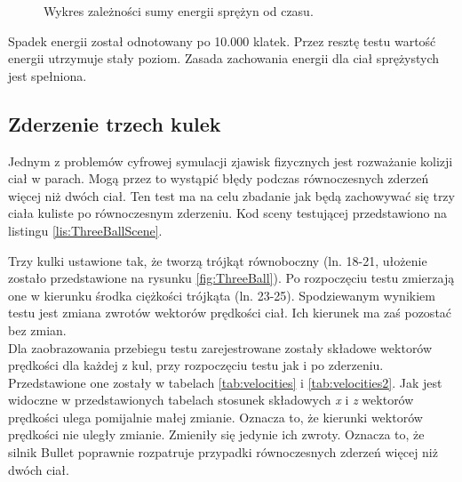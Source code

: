 \begin{figure}
\centering

\caption{Wykres zależności sumy energii sprężyn od czasu.}
\label{fig:jellyTest}
\end{figure}

Spadek energii został odnotowany po 10.000 klatek. Przez resztę testu wartość
energii utrzymuje stały poziom. Zasada zachowania energii dla ciał sprężystych
jest spełniona.
\newpage
\subsection{Zderzenie trzech kulek}
Jednym z problemów cyfrowej symulacji zjawisk fizycznych jest rozważanie kolizji
ciał w parach. Mogą przez to wystąpić błędy podczas równoczesnych zderzeń więcej
niż dwóch ciał. Ten test ma na celu zbadanie jak będą zachowywać się trzy ciała
kuliste po równoczesnym zderzeniu. Kod sceny testującej przedstawiono na
listingu \ref{lis:ThreeBallScene}.



Trzy kulki ustawione tak, że tworzą trójkąt równoboczny (ln. 18-21, ułożenie
zostało przedstawione na rysunku \ref{fig:ThreeBall}). Po rozpoczęciu testu
zmierzają one w kierunku środka ciężkości trójkąta (ln. 23-25). Spodziewanym
wynikiem testu jest zmiana zwrotów wektorów prędkości ciał. Ich kierunek ma
zaś pozostać bez zmian.\\
Dla zaobrazowania przebiegu testu zarejestrowane zostały składowe wektorów
prędkości dla każdej z kul, przy rozpoczęciu testu jak i po zderzeniu.
Przedstawione one zostały w tabelach \ref{tab:velocities} i
\ref{tab:velocities2}. Jak jest widoczne w przedstawionych tabelach stosunek
składowych \emph{x} i \emph{z} wektorów prędkości ulega pomijalnie małej
zmianie. Oznacza to, że kierunki wektorów prędkości nie uległy zmianie. Zmieniły
się jedynie ich zwroty. Oznacza to, że silnik Bullet poprawnie rozpatruje
przypadki równoczesnych zderzeń więcej niż dwóch ciał.

